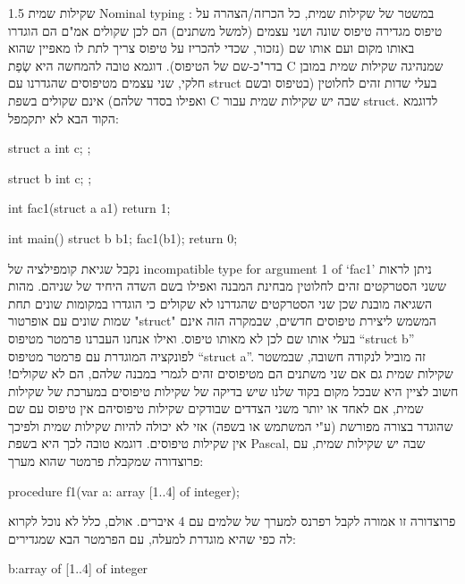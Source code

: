       1.5 שקילות שמית Nominal typing :
      במשטר של שקילות שמית, כל הכרזה/הצהרה על טיפוס מגדירה טיפוס שונה ושני עצמים
      (למשל משתנים) הם לכן שקולים אמ"ם הם הוגדרו באותו מקום ועם אותו שם (נזכור, שכדי
      להכריז על טיפוס צריך לתת לו מאפיין שהוא בדר"כ-שם של הטיפוס). דוגמא טובה להמחשה
      היא שְׂפַת C שמנהיגה שקילות שמית במובן חלקי, שני עצמים מטיפוסים שהגדרנו עם struct
      בעלי שדות זהים לחלוטין (בטיפוס ובשם ואפילו בסדר שלהם) אינם שקולים בשפת C שבה יש
      שקילות שמית עבור struct. לדוגמא הקוד הבא לא יתקמפל:

\begin{CPP}
struct a {
          int c;
};
\end{CPP}

\begin{CPP}
struct b {
          int c;
};
\end{CPP}

\begin{CPP}
int fac1(struct a a1) {
          return 1;
}

int main()
{
          struct b b1;
          fac1(b1);
          return 0;
}
\end{CPP}

      נקבל שגיאת קומפילציה של incompatible type for argument 1 of `fac1'
      ניתן לראות ששני הסטרקטים זהים לחלוטין מבחינת המבנה ואפילו בשם השדה היחיד של שניהם.
      מהות השגיאה מובנת שכן שני הסטרקטים שהגדרנו לא שקולים כי הוגדרו במקומות שונים תחת שמות שונים עם אופרטור "struct" המשמש ליצירת טיפוסים חדשים, שבמקרה הזה אינם בעלי אותו שם לכן לא מאותו טיפוס. ואילו אנחנו העברנו פרמטר מטיפוס “struct b” לפונקציה המוגדרת עם פרמטר מטיפוס “struct a”. זה מוביל לנקודה חשובה, שבמשטר שקילות שמית גם אם שני משתנים הם מטיפוסים זהים לגמרי במבנה שלהם, הם לא שקולים!
      חשוב לציין היא שבכל מקום בקוד שלנו שיש בדיקה של שקילות טיפוסים במערכת של שקילות שמית, אם לאחד או יותר משני הצדדים שבודקים שקילות טיפוסיהם אין טיפוס עם שם שהוגדר בצורה מפורשת (ע"י המשתמש או בשפה) אזי לא יכולה להיות שקילות שמית ולפיכך אין שקילות טיפוסים. דוגמא טובה לכך היא בשפת Pascal, שבה יש שקילות שמית, עם פרוצדורה שמקבלת פרמטר שהוא מערך:

\begin{PASCAL}
procedure f1(var a: array [1..4] of integer);
\end{PASCAL}

      פרוצדורה זו אמורה לקבל רפרנס למערך של שלמים עם 4 איברים. אולם, כלל לא נוכל לקרוא לה כפי שהיא מוגדרת למעלה, עם הפרמטר הבא שמגדירים:

\begin{PASCAL}
b:array of [1..4] of integer
\end{PASCAL}

